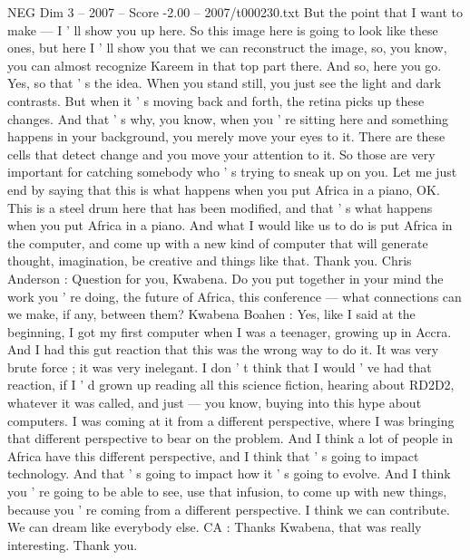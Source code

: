 \begin{textsample}{NEG Dim 3 – 2007 – Score -2.00 – 2007/t000230.txt}
But the point that I want to make — I ' ll show you up here.
So this image here is going to look like these ones, but here I ' ll show you that we can reconstruct the image, so, you know, you can almost recognize Kareem in that top part there.
And so, here you go.
Yes, so that ' s the idea.
When you stand still, you just see the light and dark contrasts.
But when it ' s moving back and forth, the retina picks up these changes.
And that ' s why, you know, when you ' re sitting here and something happens in your background, you merely move your eyes to it.
There are these cells that detect change and you move your attention to it.
So those are very important for catching somebody who ' s trying to sneak up on you.
Let me just end by saying that this is what happens when you put Africa in a piano, OK.
This is a steel drum here that has been modified, and that ' s what happens when you put Africa in a piano.
And what I would like us to do is put Africa in the computer, and come up with a new kind of computer that will generate thought, imagination, be creative and things like that.
Thank you.
Chris Anderson : Question for you, Kwabena.
Do you put together in your mind the work you ' re doing, the future of Africa, this conference — what connections can we make, if any, between them?
Kwabena Boahen : Yes, like I said at the beginning, I got my first computer when I was a teenager, growing up in Accra.
And I had this gut reaction that this was the wrong way to do it.
It was very brute force ; it was very inelegant.
I don ' t think that I would ' ve had that reaction, if I ' d grown up reading all this science fiction, hearing about RD2D2, whatever it was called, and just — you know, buying into this hype about computers.
I was coming at it from a different perspective, where I was bringing that different perspective to bear on the problem.
And I think a lot of people in Africa have this different perspective, and I think that ' s going to impact technology.
And that ' s going to impact how it ' s going to evolve.
And I think you ' re going to be able to see, use that infusion, to come up with new things, because you ' re coming from a different perspective.
I think we can contribute.
We can dream like everybody else.
CA : Thanks Kwabena, that was really interesting.
Thank you.

\end{textsample}
